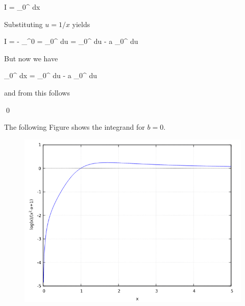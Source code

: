 \bee
I = \int_0^\infty {} dx
\eee

Substituting $u = 1/x$ yields

\bee
I = - \int_\infty^0    = \int_0^\infty {} du = \int_0^\infty {} du - a \int_0^\infty {} du
\eee

But now we have

\bee
\int_0^\infty {} dx = \int_0^\infty {} du - a \int_0^\infty {} du
\eee

and from this follows

\bee
{} \qed
\eee

The following Figure shows the integrand for $b=0$.

\begin{figure}[H]
	\includegraphics[scale=0.7]{images/interesting_integrals_06_3.png}
\end{figure}
